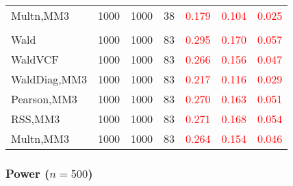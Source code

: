 \documentclass[
]{article}
\begin{document}
\begin{table}[H]
{\begin{tabular}[t]{lrrrrrr}
\hspace{1em}Multn,MM3 & 1000 & 1000 & 38 & \textcolor{red}{0.179} & \textcolor{red}{0.104} & \textcolor{red}{0.025}\\
\addlinespace[0.3em]
\multicolumn{7}{l}{\textbf{3F 15V}}\\
\hspace{1em}Wald & 1000 & 1000 & 83 & \textcolor{red}{0.295} & \textcolor{red}{0.170} & \textcolor{red}{0.057}\\
\hspace{1em}WaldVCF & 1000 & 1000 & 83 & \textcolor{red}{0.266} & \textcolor{red}{0.156} & \textcolor{red}{0.047}\\
\hspace{1em}WaldDiag,MM3 & 1000 & 1000 & 83 & \textcolor{red}{0.217} & \textcolor{red}{0.116} & \textcolor{red}{0.029}\\
\hspace{1em}Pearson,MM3 & 1000 & 1000 & 83 & \textcolor{red}{0.270} & \textcolor{red}{0.163} & \textcolor{red}{0.051}\\
\hspace{1em}RSS,MM3 & 1000 & 1000 & 83 & \textcolor{red}{0.271} & \textcolor{red}{0.168} & \textcolor{red}{0.054}\\
\hspace{1em}Multn,MM3 & 1000 & 1000 & 83 & \textcolor{red}{0.264} & \textcolor{red}{0.154} & \textcolor{red}{0.046}\\
\bottomrule
\end{tabular}}
\endgroup{}
\end{table}

\hypertarget{power-n500-1}{%
\subsubsection{\texorpdfstring{Power
(\(n=500\))}{Power (n=500)}}\label{power-n500-1}}
\end{document}
